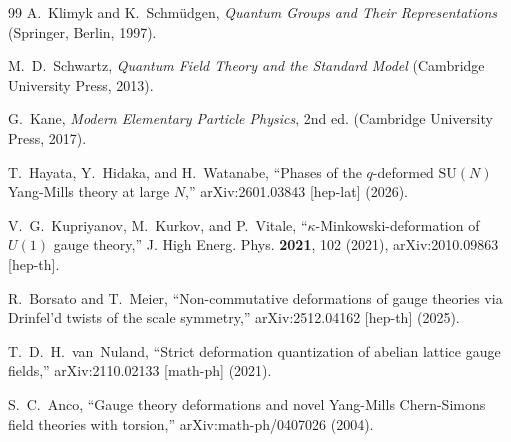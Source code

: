 \documentclass[12pt,a4paper]{article}
\theoremstyle{plain}
\theoremstyle{definition}
\begin{document}
\begin{thebibliography}{99}
A.~Klimyk and K.~Schm{\"u}dgen, \emph{Quantum Groups and Their Representations} (Springer, Berlin, 1997).

M.~D.~Schwartz, \emph{Quantum Field Theory and the Standard Model} (Cambridge University Press, 2013).

G.~Kane, \emph{Modern Elementary Particle Physics}, 2nd ed. (Cambridge University Press, 2017).

T.~Hayata, Y.~Hidaka, and H.~Watanabe, ``Phases of the $q$-deformed $\mathrm{SU}(N)$ Yang-Mills theory at large $N$,'' arXiv:2601.03843 [hep-lat] (2026).

V.~G.~Kupriyanov, M.~Kurkov, and P.~Vitale, ``$\kappa$-Minkowski-deformation of $U(1)$ gauge theory,'' J. High Energ. Phys. \textbf{2021}, 102 (2021), arXiv:2010.09863 [hep-th].

R.~Borsato and T.~Meier, ``Non-commutative deformations of gauge theories via Drinfel'd twists of the scale symmetry,'' arXiv:2512.04162 [hep-th] (2025).

T.~D.~H.~van~Nuland, ``Strict deformation quantization of abelian lattice gauge fields,'' arXiv:2110.02133 [math-ph] (2021).

S.~C.~Anco, ``Gauge theory deformations and novel Yang-Mills Chern-Simons field theories with torsion,'' arXiv:math-ph/0407026 (2004).


\end{thebibliography}
\end{document}
